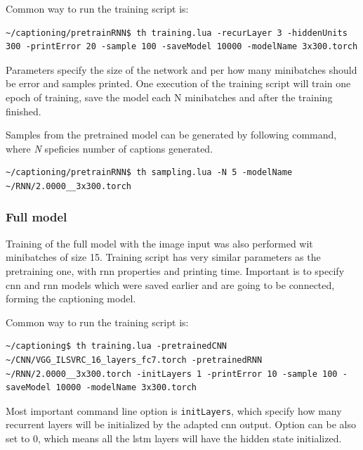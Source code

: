 Common way to run the training script is:

\hspace{1cm}
\begin{lstlisting}[firstnumber=1,breakindent=60pt,frame=single]
~/captioning/pretrainRNN$ th training.lua -recurLayer 3 -hiddenUnits 300 -printError 20 -sample 100 -saveModel 10000 -modelName 3x300.torch
\end{lstlisting}
\hspace{1cm}

Parameters specify the size of the network and per how many minibatches should be error and samples printed. One execution of the training script will train one epoch of training, save the model each N minibatches and after the training finished.

Samples from the pretrained model can be generated by following command, where \emph{N} speficies number of captions generated.

\hspace{1cm}
\begin{lstlisting}[firstnumber=1,breakindent=60pt,frame=single]
~/captioning/pretrainRNN$ th sampling.lua -N 5 -modelName ~/RNN/2.0000__3x300.torch
\end{lstlisting}
\hspace{1cm}

\subsubsection{Full model}

Training of the full model with the image input was also performed wit minibatches of size 15. Training script has very similar parameters as the pretraining one, with \gls{rnn} properties and printing time. Important is to specify \gls{cnn} and \gls{rnn} models which were saved earlier and are going to be connected, forming the captioning model. 

Common way to run the training script is:

\hspace{1cm}
\begin{lstlisting}[firstnumber=1,breakindent=60pt,frame=single]
~/captioning$ th training.lua -pretrainedCNN ~/CNN/VGG_ILSVRC_16_layers_fc7.torch -pretrainedRNN ~/RNN/2.0000__3x300.torch -initLayers 1 -printError 10 -sample 100 -saveModel 10000 -modelName 3x300.torch
\end{lstlisting}
\hspace{1cm}

Most important command line option is \texttt{initLayers}, which specify how many recurrent layers will be initialized by the adapted \gls{cnn} output. Option can be also set to 0, which means all the \gls{lstm} layers will have the hidden state initialized.

